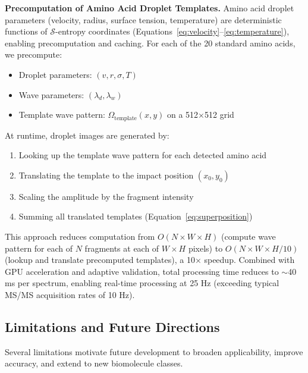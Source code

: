 \documentclass[11pt,twocolumn]{article}
\newcommand{\sentropy}{$\mathcal{S}$-entropy}
\begin{document}
\textbf{Precomputation of Amino Acid Droplet Templates.} Amino acid droplet parameters (velocity, radius, surface tension, temperature) are deterministic functions of \sentropy{} coordinates (Equations~\ref{eq:velocity}--\ref{eq:temperature}), enabling precomputation and caching. For each of the 20 standard amino acids, we precompute:
\begin{itemize}[leftmargin=*]
    \item Droplet parameters: $(v, r, \sigma, T)$
    \item Wave parameters: $(\lambda_d, \lambda_w)$
    \item Template wave pattern: $\Omega_{\text{template}}(x, y)$ on a 512$\times$512 grid
\end{itemize}
At runtime, droplet images are generated by:
\begin{enumerate}[leftmargin=*]
    \item Looking up the template wave pattern for each detected amino acid
    \item Translating the template to the impact position $(x_0, y_0)$
    \item Scaling the amplitude by the fragment intensity
    \item Summing all translated templates (Equation~\ref{eq:superposition})
\end{enumerate}
This approach reduces computation from $O(N \times W \times H)$ (compute wave pattern for each of $N$ fragments at each of $W \times H$ pixels) to $O(N \times W \times H / 10)$ (lookup and translate precomputed templates), a 10× speedup. Combined with GPU acceleration and adaptive validation, total processing time reduces to $\sim$40 ms per spectrum, enabling real-time processing at 25 Hz (exceeding typical MS/MS acquisition rates of 10 Hz).

\subsection{Limitations and Future Directions}

Several limitations motivate future development to broaden applicability, improve accuracy, and extend to new biomolecule classes.
\end{document}
